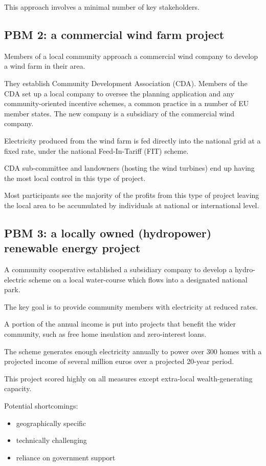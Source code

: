 This approach involves a minimal number of key stakeholders.

\subsection{PBM 2: a commercial wind farm project}

Members of a local community approach a commercial wind company to develop a
wind farm in their area.

They establish Community Development Association (CDA). Members of the CDA
set up a local company to oversee the planning application and any 
community-oriented incentive schemes, a common practice in a number of EU
member states. The new company is a subsidiary of the commercial wind company.

Electricity produced from the wind farm is fed directly into the national grid
at a fixed rate, under the national Feed-In-Tariff (FIT) scheme.

CDA sub-committee and landowners (hosting the wind turbines) end up having the
most local control in this type of project.

Most participants see the majority of the profits from this type of project
leaving the local area to be accumulated by individuals at national or
international level.

\subsection{PBM 3: a locally owned (hydropower) renewable energy project}

A community cooperative established a subsidiary company to develop a
hydro-electric scheme on a local water-course which flows into a
designated national park.

The key goal is to provide community members with electricity at reduced rates.

A portion of the annual income is put into projects that benefit the wider
community, such as free home insulation and zero-interest loans.

The scheme generates enough electricity annually to power over 300 homes with
a projected income of several million euros over a projected 20-year period.

This project scored highly on all measures except extra-local wealth-generating
capacity.

Potential shortcomings:
\begin{itemize}
	\item geographically specific
	\item technically challenging
	\item reliance on government support
\end{itemize}

